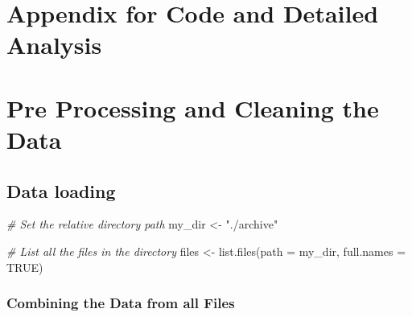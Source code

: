 \documentclass[
]{article}
\newenvironment{Shaded}{\begin{snugshade}}{\end{snugshade}}
\newcommand{\AttributeTok}[1]{\textcolor[rgb]{0.77,0.63,0.00}{#1}}
\newcommand{\CommentTok}[1]{\textcolor[rgb]{0.56,0.35,0.01}{\textit{#1}}}
\newcommand{\ConstantTok}[1]{\textcolor[rgb]{0.00,0.00,0.00}{#1}}
\newcommand{\FunctionTok}[1]{\textcolor[rgb]{0.00,0.00,0.00}{#1}}
\newcommand{\NormalTok}[1]{#1}
\newcommand{\OtherTok}[1]{\textcolor[rgb]{0.56,0.35,0.01}{#1}}
\newcommand{\StringTok}[1]{\textcolor[rgb]{0.31,0.60,0.02}{#1}}
\begin{document}
\hypertarget{appendix-for-code-and-detailed-analysis}{%
\section{Appendix for Code and Detailed
Analysis}\label{appendix-for-code-and-detailed-analysis}}

\hypertarget{pre-processing-and-cleaning-the-data}{%
\section{Pre Processing and Cleaning the
Data}\label{pre-processing-and-cleaning-the-data}}

\hypertarget{data-loading}{%
\subsection{Data loading}\label{data-loading}}

\begin{Shaded}
\begin{Highlighting}[]
\CommentTok{\# Set the relative directory path}
\NormalTok{my\_dir }\OtherTok{\textless{}{-}} \StringTok{"./archive"}

\CommentTok{\# List all the files in the directory}
\NormalTok{files }\OtherTok{\textless{}{-}} \FunctionTok{list.files}\NormalTok{(}\AttributeTok{path =}\NormalTok{ my\_dir, }\AttributeTok{full.names =} \ConstantTok{TRUE}\NormalTok{)}
\end{Highlighting}
\end{Shaded}

\hypertarget{combining-the-data-from-all-files}{%
\subsubsection{Combining the Data from all
Files}\label{combining-the-data-from-all-files}}
\end{document}
